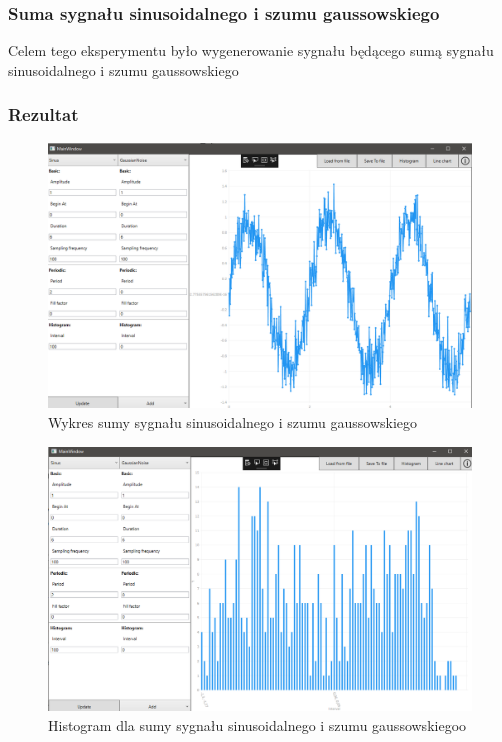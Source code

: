 \documentclass[12pt]{article}
\begin{document}
\subsubsection{Suma sygnału sinusoidalnego i szumu gaussowskiego}
Celem tego eksperymentu było wygenerowanie sygnału będącego sumą sygnału sinusoidalnego i szumu gaussowskiego


\subsubsection{Rezultat}

\begin{figure}[H]
 \centering
 \includegraphics[width=14cm]{images/addsingauss1.PNG}
 \vspace{-0.3cm}
 \caption{Wykres sumy sygnału sinusoidalnego i szumu gaussowskiego}
 \label{gui}
\end{figure}

\begin{figure}[H]
 \centering
 \includegraphics[width=14cm]{images/addsingauss1hist.PNG}
 \vspace{-0.3cm}
 \caption{Histogram dla  sumy sygnału sinusoidalnego i szumu gaussowskiegoo}
 \label{gui}
\end{figure}
\end{document}
